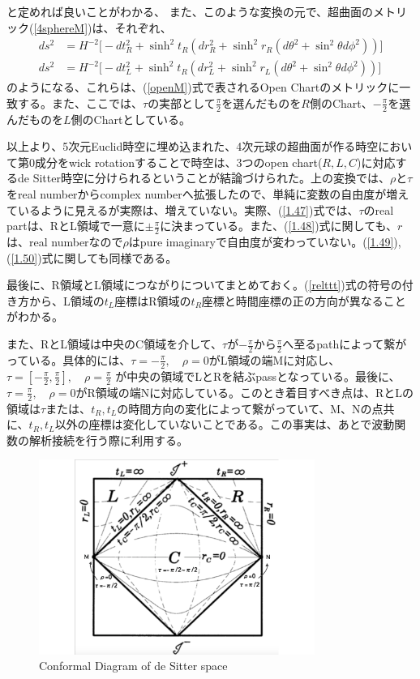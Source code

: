 と定めれば良いことがわかる、
また、このような変換の元で、超曲面のメトリック(\ref{4sphereM})は、それぞれ、
\begin{align}
  ds^2&=H^{-2}\biggr[-dt_{R}^2+\sinh^2{t_{R}}(dr_{R}^2+\sinh^2r_{R}(d\theta^2+\sin^2\theta d\phi^2))\biggr] \\
ds^2&=H^{-2}\biggr[-dt_{L}^2+\sinh^2{t_{R}}(dr_{L}^2+\sinh^2r_{L}(d\theta^2+\sin^2\theta d\phi^2))\biggr]
\end{align}
のようになる、これらは、(\ref{openM})式で表されるOpen Chartのメトリックに一致する。また、ここでは、$\tau$の実部として$\frac{\pi}{2}$を選んだものを$R$側のChart、$-\frac{\pi}{2}$を選んだものを$L$側のChartとしている。

以上より、5次元Euclid時空に埋め込まれた、4次元球の超曲面が作る時空において第$0$成分をwick rotationすることで時空は、3つのopen chart($R,L,C$)に対応するde Sitter時空に分けられるということが結論づけられた。上の変換では、$\rho$と$\tau$をreal numberからcomplex numberへ拡張したので、単純に変数の自由度が増えているように見えるが実際は、増えていない。実際、(\ref{1.47})式では、$\tau$のreal partは、RとL領域で一意に$\pm\frac{\pi}{2}$に決まっている。また、(\ref{1.48})式に関しても、$r$は、real numberなので$\rho$はpure imaginaryで自由度が変わっていない。(\ref{1.49}),(\ref{1.50})式に関しても同様である。

最後に、R領域とL領域につながりについてまとめておく。(\ref{relttt})式の符号の付き方から、L領域の$t_L$座標はR領域の$t_R$座標と時間座標の正の方向が異なることがわかる。

また、RとL領域は中央のC領域を介して、$\tau$が$-\frac{\pi}{2}$から$\frac{\pi}{2}$へ至るpathによって繋がっている。具体的には、$\tau=-\frac{\pi}{2},\quad \rho=0$がL領域の端Mに対応し、$\tau=[-\frac{\pi}{2},\frac{\pi}{2}],\quad \rho=\frac{\pi}{2}$
が中央の領域でLとRを結ぶpassとなっている。最後に、$\tau=\frac{\pi}{2},\quad \rho=0$がR領域の端Nに対応している。このとき着目すべき点は、RとLの領域は$\tau$または、$t_R,t_L$の時間方向の変化によって繋がっていて、M、Nの点共に、$t_R,t_L$以外の座標は変化していないことである。この事実は、あとで波動関数の解析接続を行う際に利用する。


\begin{figure}[H]
  \begin{center}
  \includegraphics[width=9cm,angle=0]{desRCL.pdf}
  \caption{Conformal Diagram of de Sitter space}
    \label{desRL}
  \end{center}
\end{figure}


